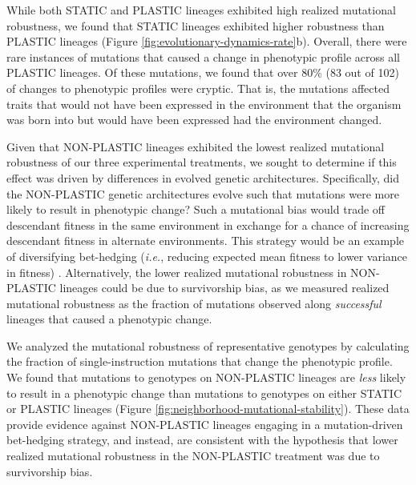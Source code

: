 While both STATIC and PLASTIC lineages exhibited high realized mutational robustness, we found that STATIC lineages exhibited higher robustness than PLASTIC lineages (Figure \ref{fig:evolutionary-dynamics-rate}b). 
Overall, there were rare instances of mutations that caused a change in phenotypic profile across all PLASTIC lineages.
Of these mutations, we found that over 80\% (83 out of 102) of changes to phenotypic profiles were cryptic. 
That is, the mutations affected traits that would not have been expressed in the environment that the organism was born into but would have been expressed had the environment changed.

%
%
%


Given that NON-PLASTIC lineages exhibited the lowest realized mutational robustness of our three experimental treatments, we sought to determine if this effect was driven by differences in evolved genetic architectures.
Specifically, did the NON-PLASTIC genetic architectures evolve such that mutations were more likely to result in phenotypic change?
Such a  mutational bias would trade off descendant fitness in the same environment in exchange for a chance of increasing descendant fitness in alternate environments.
This strategy would be an example of diversifying bet-hedging (\textit{i.e.}, reducing expected mean fitness to lower variance in fitness) \citep{childs2010evolutionary}.
Alternatively, the lower realized mutational robustness in NON-PLASTIC lineages could be due to survivorship bias, as we measured realized mutational robustness as the fraction of mutations observed along \textit{successful} lineages that caused a phenotypic change. 


We analyzed the mutational robustness of representative genotypes by calculating the fraction of single-instruction mutations that change the phenotypic profile.
We found that mutations to genotypes on NON-PLASTIC lineages are \textit{less} likely to result in a phenotypic change than mutations to genotypes on either STATIC or PLASTIC lineages (Figure \ref{fig:neighborhood-mutational-stability}).
These data provide evidence against NON-PLASTIC lineages engaging in a mutation-driven bet-hedging strategy, and instead, are consistent with the hypothesis that lower realized mutational robustness in the NON-PLASTIC treatment was due to survivorship bias.



